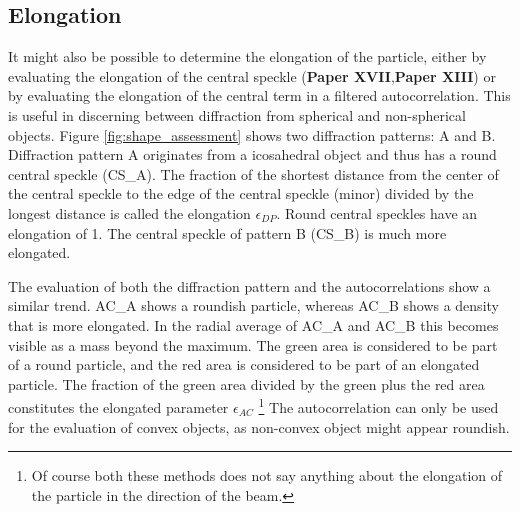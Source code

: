 \subsection{Elongation}

It might also be possible to determine the elongation of the particle, either by evaluating the elongation of the central speckle (\textbf{Paper XVII},\textbf{Paper XIII}) or by evaluating the elongation of the central term in a filtered autocorrelation. This is useful in discerning between diffraction from spherical and non-spherical objects. Figure \ref{fig:shape_assessment} shows two diffraction patterns: A and B. Diffraction pattern A originates from a icosahedral object and thus has a round central speckle (CS\_A). The fraction of the shortest distance from the center of the central speckle to the edge of the central speckle (minor) divided by the longest distance is called the elongation $\epsilon_{DP}$. Round central speckles have an elongation of 1. The central speckle of pattern B (CS\_B) is much more elongated. 

The evaluation of both the diffraction pattern and the autocorrelations show a similar trend. AC\_A shows a roundish particle, whereas AC\_B shows a density that is more elongated. In the radial average of AC\_A and AC\_B this becomes visible as a mass beyond the maximum. The green area is considered to be part of a round particle, and the red area is considered to be part of an elongated particle. The fraction of the green area divided by the green plus the red area constitutes the elongated parameter $\epsilon_{AC}$ \footnote{Of course both these methods does not say anything about the elongation of the particle in the direction of the beam.
} The autocorrelation can only be used for the evaluation of convex objects, as non-convex object might appear roundish. 

